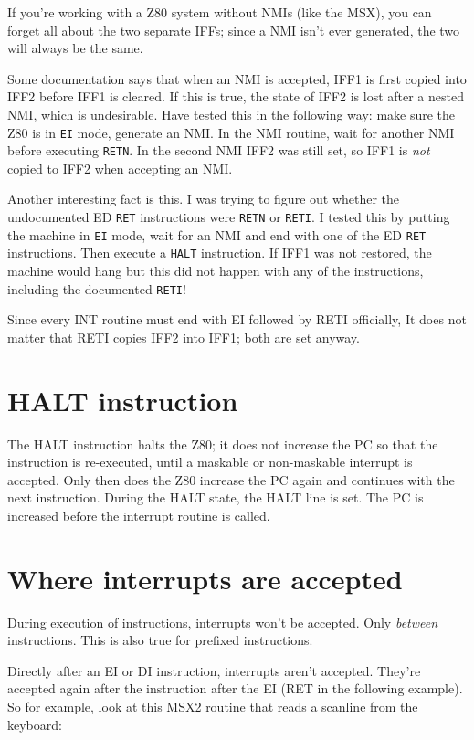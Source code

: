 \documentclass[oneside,a4paper]{book}
\begin{document}
If you're working with a Z80 system without NMIs (like the MSX), you can 
forget all about the two separate IFFs; since a NMI isn't ever generated, 
the two will always be the same. 

Some documentation says that when an NMI is accepted, IFF1 is first copied
into IFF2 before IFF1 is cleared. If this is true, the state of IFF2
is lost after a nested NMI, which is undesirable. Have tested this in the
following way: make sure the Z80 is in {\tt EI} mode, generate an NMI.
In the NMI routine, wait for another NMI before executing {\tt RETN}. In
the second NMI IFF2 was still set, so IFF1 is {\em not} copied to
IFF2 when accepting an NMI.

Another interesting fact is this. I was trying to figure out whether 
the undocumented ED {\tt RET} instructions were {\tt RETN} or {\tt RETI}.
I tested this by putting the machine in {\tt EI} mode, wait for an
NMI and end with one of the ED {\tt RET} instructions. Then execute
a {\tt HALT} instruction. If IFF1 was not restored, the machine would
hang but this did not happen with any of the instructions, including
the documented {\tt RETI}!

Since every INT routine must end with {\ttfamily EI} followed by 
{\ttfamily RETI} officially, It does not matter that RETI copies IFF2 into 
IFF1; both are set anyway.


\section{HALT instruction}

The HALT instruction halts the Z80; it does not increase the PC so
that the instruction is re-executed, until a maskable or non-maskable 
interrupt is accepted. Only then does the Z80 increase the PC again 
and continues with the next instruction. During the HALT state, the 
HALT line is set. The PC is increased before the interrupt routine is called.


\section{Where interrupts are accepted}

During execution of instructions, interrupts won't be accepted. Only 
{\em between} instructions. This is also true for prefixed instructions.

Directly after an EI or DI instruction, interrupts aren't accepted. They're
accepted again after the instruction after the EI (RET in the following 
example). So for example, look at this MSX2 routine that reads a scanline 
from the keyboard:
\end{document}

